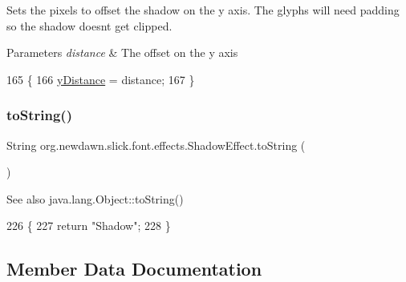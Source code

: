 Sets the pixels to offset the shadow on the y axis. The glyphs will need padding so the shadow doesn\textquotesingle{}t get clipped.


\begin{DoxyParams}{Parameters}
{\em distance} & The offset on the y axis \\
\hline
\end{DoxyParams}

\begin{DoxyCode}
165                                               \{
166         \mbox{\hyperlink{classorg_1_1newdawn_1_1slick_1_1font_1_1effects_1_1_shadow_effect_a06d791511d507ab313c764edbde43fa8}{yDistance}} = distance;
167     \}
\end{DoxyCode}
\mbox{\label{classorg_1_1newdawn_1_1slick_1_1font_1_1effects_1_1_shadow_effect_a0aaf76c342bcc2b0d267c2d6809a1372}} 
\subsubsection{\texorpdfstring{to\+String()}{toString()}}
{\footnotesize\ttfamily String org.\+newdawn.\+slick.\+font.\+effects.\+Shadow\+Effect.\+to\+String (\begin{DoxyParamCaption}{ }\end{DoxyParamCaption})\hspace{0.3cm}{\ttfamily [inline]}}

\begin{DoxySeeAlso}{See also}
java.\+lang.\+Object\+::to\+String() 
\end{DoxySeeAlso}

\begin{DoxyCode}
226                              \{
227         \textcolor{keywordflow}{return} \textcolor{stringliteral}{"Shadow"};
228     \}
\end{DoxyCode}


\subsection{Member Data Documentation}
\mbox{\label{classorg_1_1newdawn_1_1slick_1_1font_1_1effects_1_1_shadow_effect_a9383b2ba78f68f6302bfd9e9cb5de0f0}} 

